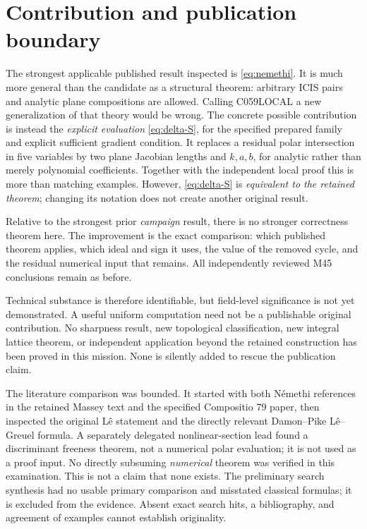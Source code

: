 \documentclass[11pt]{article}
\begin{document}
\section{Contribution and publication boundary}

The strongest applicable published result inspected is
\eqref{eq:nemethi}.  It is much more general than the candidate
as a structural theorem: arbitrary ICIS pairs and analytic
plane compositions are allowed.  Calling C059LOCAL a new
generalization of that theory would be wrong.
The concrete possible contribution is instead the
\emph{explicit evaluation} \eqref{eq:delta-S}, for the
specified prepared family and explicit sufficient gradient
condition.  It replaces a residual polar intersection in five
variables by two plane Jacobian lengths and \(k,a,b\), for
analytic rather than merely polynomial coefficients.
Together with the independent local proof this is more than
matching examples.  However, \eqref{eq:delta-S} is
\emph{equivalent to the retained theorem}; changing its notation
does not create another original result.

Relative to the strongest prior \emph{campaign} result, there
is no stronger correctness theorem here.  The improvement is
the exact comparison: which published theorem applies, which
ideal and sign it uses, the value of the removed cycle, and
the residual numerical input that remains.  All independently
reviewed M45 conclusions remain as before.

Technical substance is therefore identifiable, but
field-level significance is not yet demonstrated.  A useful
uniform computation need not be a publishable original
contribution.  No sharpness result, new topological
classification, new integral lattice theorem, or independent
application beyond the retained construction has been proved
in this mission.  None is silently added to rescue the
publication claim.

The literature comparison was bounded.  It started with both
N\'emethi references in the retained Massey text and the
specified Compositio 79 paper, then inspected the original
L\^e statement and the directly relevant Damon--Pike
L\^e--Greuel formula.  A separately delegated nonlinear-section
lead found a discriminant freeness theorem, not a numerical
polar evaluation; it is not used as a proof input.
No directly subsuming \emph{numerical} theorem was verified in
this examination.  This is not a claim that none exists.
The preliminary search synthesis had no usable primary
comparison and misstated classical formulas; it is excluded
from the evidence.  Absent exact search hits, a bibliography,
and agreement of examples cannot establish originality.
\end{document}
